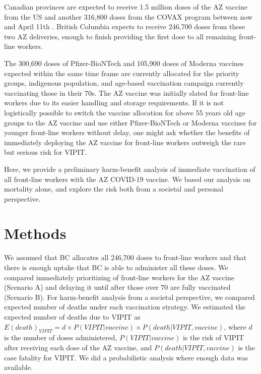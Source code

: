 \documentclass[]{interact}
\theoremstyle{plain}%
\theoremstyle{definition}
\theoremstyle{remark}
\begin{document}
Canadian provinces are expected to receive 1.5 million doses of the AZ
vaccine from the US and another 316,800 doses from the COVAX program
between now and April 11th \citep{government_of_canada_vaccines_2021}.
British Columbia expects to receive 246,700 doses from these two AZ
deliveries, enough to finish providing the first dose to all remaining
front-line workers.

The 300,690 doses of Pfizer-BioNTech and 105,900 doses of Moderna
vaccines expected within the same time frame are currently allocated for
the priority groups, indigenous population, and age-based vaccination
campaign currently vaccinating those in their 70s. The AZ vaccine was
initially slated for front-line workers due to its easier handling and
storage requirements. If it is not logistically possible to switch the
vaccine allocation for above 55 years old age groups to the AZ vaccine
and use either Pfizer-BioNTech or Moderna vaccines for younger
front-line workers without delay, one might ask whether the benefits of
immediately deploying the AZ vaccine for front-line workers outweigh the
rare but serious risk for VIPIT.

Here, we provide a preliminary harm-benefit analysis of immediate
vaccination of all front-line workers with the AZ COVID-19 vaccine. We
based our analysis on mortality alone, and explore the risk both from a
societal and personal perspective.

\hypertarget{methods}{%
\section{Methods}\label{methods}}

We assumed that BC allocates all 246,700 doses to front-line workers and
that there is enough uptake that BC is able to administer all these
doses. We compared immediately prioritizing of front-line workers for
the AZ vaccine (Scenario A) and delaying it until after those over 70
are fully vaccinated (Scenario B). For harm-benefit analysis from a
societal perspective, we compared expected number of deaths under each
vaccination strategy. We estimated the expected number of deaths due to
VIPIT as
\(E(death)_{VIPIT} = d \times P(VIPIT|vaccine) \times P(death|VIPIT, vaccine)\),
where \(d\) is the number of doses administered, \(P(VIPIT|vaccine)\) is
the risk of VIPIT after receiving each dose of the AZ vaccine, and
\(P(death|VIPIT, vaccine)\) is the case fatality for VIPIT. We did a
probabilistic analysis where enough data was available.
\end{document}
